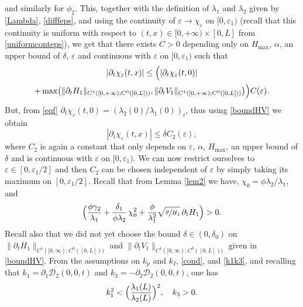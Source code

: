 \documentclass[JEP,XML,SOM,Unicode]{cedram}
\let\mathcal\mathscr
\theoremstyle{definition}
\begin{document}
and similarly for $\phi_{2}$. This, together with the definition of $\lambda_{1}$ and $\lambda_{2}$ given by \eqref{Lambda}, \eqref{difffeps}, and
using the continuity of $\varepsilon\to \chi_{\varepsilon}$ on $[0,\varepsilon_{1})$ (recall that this continuity is uniform with respect to $(t,x)\in[0,+\infty)\times[0,L]$ {from \eqref{uniformconteps}}),
we get that there exists $C>0$ depending only on $H_{\max}$, $\alpha$, {an upper bound of $\delta$,} $\varepsilon$ and continuous with $\varepsilon$ on $[0,\varepsilon_{1})$ such that\vspace*{-5pt}
\begin{multline*}
|\partial_{t}\chi_{\varepsilon}(t,x)|\leq \Bigl(|\partial_{t}\chi_{\varepsilon}(t,0)|\\
+ \max \bigl(\lVert\partial_{t}H_{1}\rVert_{C^{1}([0,+\infty);C^{0}([0,L]))},\lVert\partial_{t}V_{1}\rVert_{C^{1}([0,+\infty);C^{0}([0,L]))} \bigr) \Bigr)C(\varepsilon).
\end{multline*}
But, from \eqref{eqf} $\partial_{t}\chi_{\varepsilon}(t,0)=\left(\lambda_{2}{(0)}/\lambda_{1}{(0)}\right)_{t}$, thus
using \eqref{boundHV}
we obtain
\begin{equation}
|\partial_{t}\chi_{\varepsilon}(t,x)|\leq \delta C_{2}(\varepsilon),
\label{borne_dtfeps}
\end{equation}
where $C_{2}$ is again a constant that only depends on $\varepsilon$, $\alpha$, $H_{\max}$, {an upper bound of $\delta$} and is continuous with $\varepsilon$ on $[0,\varepsilon_{1})$.
We can now restrict ourselves to $\varepsilon\in[0,\varepsilon_{1}/2]$ and then $C_{2}$ can be chosen independent of $\varepsilon$ by simply taking its maximum on $[0,\varepsilon_{1}/2]$.
Recall that from Lemma \ref{lem2} we have, $\chi_{0}=\phi\lambda_{2}/\lambda_{1}$, and
\begin{equation*}
\Bigl(\frac{\phi\gamma_{2}}{\lambda_{1}}+\frac{\delta_{1}}{\phi\lambda_{2}}\,\chi_{0}^{2}+{\frac{\phi}{\lambda_{1}^{2}}}\sqrt{\sfrac{g}{H_{1}}}\,\partial_{t} H_{1} \Bigr)>0.
\end{equation*}
Recall {also} that we did not yet choose the bound $\delta\in(0,{\delta_{0}})$ on $\lVert\partial_{t}H_{1}\rVert_{C^{1}([0,\infty);C^{0}([0,L]))}$ and $\lVert\partial_{t}V_{1}\rVert_{C^{1}([0,\infty);C^{0}([0,L]))}$ given in \eqref{boundHV}.
From the assumptions on $k_{p}$ and $k_{I}$, \ie \eqref{cond}, and \eqref{k1k3}, {and recalling that $k_{1}=\partial_{1}\mathcal{D}_{2}(0,0,t)$
and $k_{3}=-\partial_{2}\mathcal{D}_{2}(0,0,t)$}, one has
\begin{equation}
k_{1}^{2}<\Bigl(\frac{\lambda_{1}(L)}{\lambda_{2}(L)} \Bigr)^{2},\quad k_{3}>0.
\label{condk1k3}
\end{equation}
\end{document}
